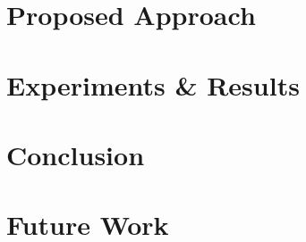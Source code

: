 \documentclass[conference]{IEEEtran}
\begin{document}
\section{Proposed Approach}
\label{sec:proposed-approach}


\section{Experiments \& Results}
\label{sec:experiments-results}


\section{Conclusion}
\label{sec:conclusion}


\section{Future Work}
\label{sec:future-work}
\end{document}
